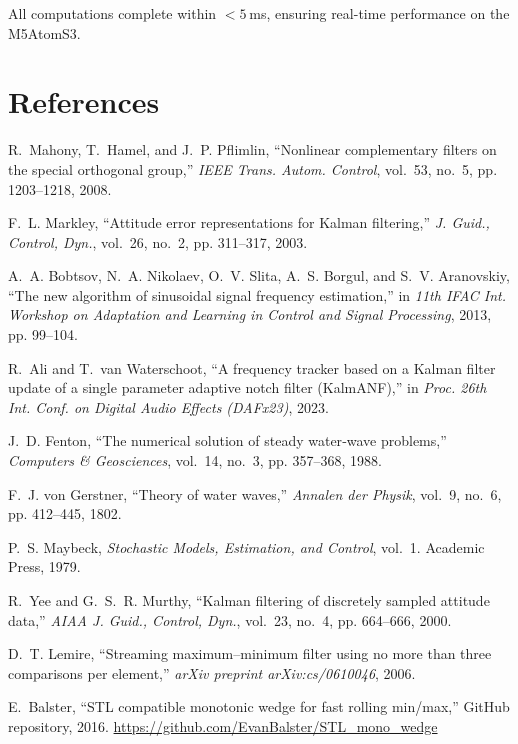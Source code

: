 \documentclass[12pt,letterpaper]{article}
\begin{document}
All computations complete within \(<5\) ms, ensuring real-time performance on the M5AtomS3.

\section*{References}
\begin{thebibliography}{10}

R.~Mahony, T.~Hamel, and J.~P. Pflimlin, “Nonlinear complementary filters on the special orthogonal group,” \emph{IEEE Trans. Autom. Control}, vol.~53, no.~5, pp. 1203–1218, 2008.

F.~L. Markley, “Attitude error representations for Kalman filtering,” \emph{J. Guid., Control, Dyn.}, vol.~26, no.~2, pp. 311–317, 2003.

A.~A. Bobtsov, N.~A. Nikolaev, O.~V. Slita, A.~S. Borgul, and S.~V. Aranovskiy, “The new algorithm of sinusoidal signal frequency estimation,” in \emph{11th IFAC Int. Workshop on Adaptation and Learning in Control and Signal Processing}, 2013, pp. 99–104.

R.~Ali and T.~van Waterschoot, “A frequency tracker based on a Kalman filter update of a single parameter adaptive notch filter (KalmANF),” in \emph{Proc. 26th Int. Conf. on Digital Audio Effects (DAFx23)}, 2023.

J.~D. Fenton, “The numerical solution of steady water‐wave problems,” \emph{Computers \& Geosciences}, vol.~14, no.~3, pp. 357–368, 1988.

F.~J. von Gerstner, “Theory of water waves,” \emph{Annalen der Physik}, vol.~9, no.~6, pp. 412–445, 1802.

P.~S. Maybeck, \emph{Stochastic Models, Estimation, and Control}, vol.~1. Academic Press, 1979.

R.~Yee and G.~S.~R. Murthy, “Kalman filtering of discretely sampled attitude data,” \emph{AIAA J. Guid., Control, Dyn.}, vol.~23, no.~4, pp. 664–666, 2000.

D.~T. Lemire, “Streaming maximum–minimum filter using no more than three comparisons per element,” \emph{arXiv preprint arXiv:cs/0610046}, 2006.

E.~Balster, “STL compatible monotonic wedge for fast rolling min/max,” GitHub repository, 2016. \url{https://github.com/EvanBalster/STL_mono_wedge}

\end{thebibliography}
\end{document}
